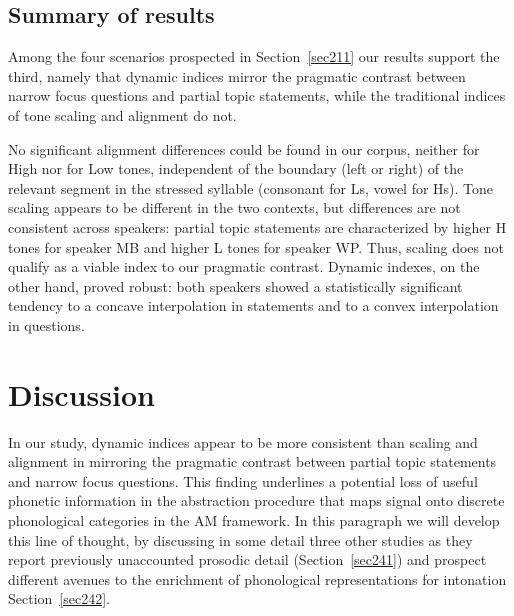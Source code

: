 \subsection{Summary of results}\label{sec234}
Among the four scenarios prospected in Section~\ref{sec211} our results support the third, namely that dynamic indices mirror the pragmatic contrast between narrow focus questions and partial topic statements, while the traditional indices of tone scaling and alignment do not.

No significant alignment differences could be found in our corpus, neither for High nor for Low tones, independent of the boundary (left or right) of the relevant segment in the stressed syllable (consonant for Ls, vowel for Hs). Tone scaling appears to be different in the two contexts, but differences are not consistent across speakers: partial topic statements are characterized by higher H tones for speaker MB and higher L tones for speaker WP. Thus, scaling does not qualify as a viable index to our pragmatic contrast. Dynamic indexes, on the other hand, proved robust: both speakers showed a statistically significant tendency to a concave interpolation in statements and to a convex interpolation in questions. 

\section{Discussion}\label{sec24}
In our study, dynamic indices appear to be more consistent than scaling and alignment in mirroring the pragmatic contrast between partial topic statements and narrow focus questions. This finding underlines a potential loss of useful phonetic information in the abstraction procedure that maps  signal onto discrete phonological categories in the AM framework. In this paragraph we will develop this line of thought, by discussing in some detail three other studies as they report previously unaccounted prosodic detail (Section~\ref{sec241}) and prospect different avenues to the enrichment of phonological representations for intonation Section~\ref{sec242}.

